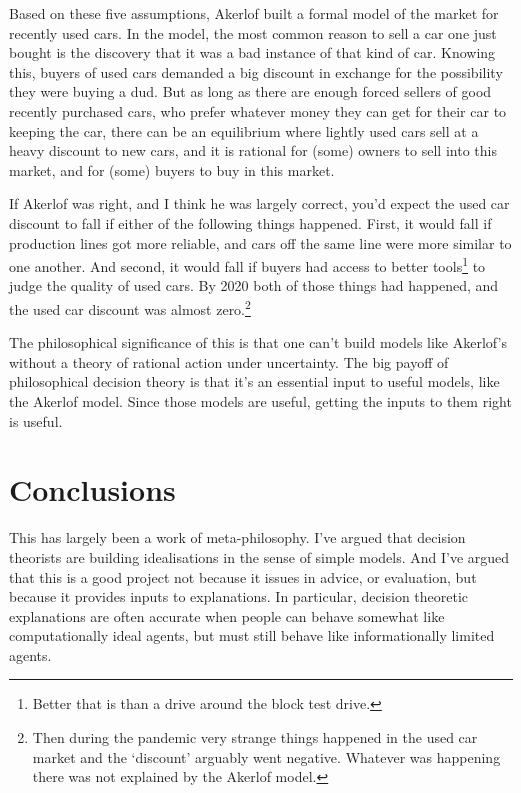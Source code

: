 \documentclass[
  12pt,
  letterpaper,
  DIV=11,
  numbers=noendperiod,
  twoside]{scrartcl}
\begin{document}
Based on these five assumptions, Akerlof built a formal model of the
market for recently used cars. In the model, the most common reason to
sell a car one just bought is the discovery that it was a bad instance
of that kind of car. Knowing this, buyers of used cars demanded a big
discount in exchange for the possibility they were buying a dud. But as
long as there are enough forced sellers of good recently purchased cars,
who prefer whatever money they can get for their car to keeping the car,
there can be an equilibrium where lightly used cars sell at a heavy
discount to new cars, and it is rational for (some) owners to sell into
this market, and for (some) buyers to buy in this market.

If Akerlof was right, and I think he was largely correct, you'd expect
the used car discount to fall if either of the following things
happened. First, it would fall if production lines got more reliable,
and cars off the same line were more similar to one another. And second,
it would fall if buyers had access to better tools\footnote{Better that
  is than a drive around the block test drive.} to judge the quality of
used cars. By 2020 both of those things had happened, and the used car
discount was almost zero.\footnote{Then during the pandemic very strange
  things happened in the used car market and the `discount' arguably
  went negative. Whatever was happening there was not explained by the
  Akerlof model.}

The philosophical significance of this is that one can't build models
like Akerlof's without a theory of rational action under uncertainty.
The big payoff of philosophical decision theory is that it's an
essential input to useful models, like the Akerlof model. Since those
models are useful, getting the inputs to them right is useful.

\section{Conclusions}\label{conclusions}

This has largely been a work of meta-philosophy. I've argued that
decision theorists are building idealisations in the sense of simple
models. And I've argued that this is a good project not because it
issues in advice, or evaluation, but because it provides inputs to
explanations. In particular, decision theoretic explanations are often
accurate when people can behave somewhat like computationally ideal
agents, but must still behave like informationally limited agents.
\end{document}
